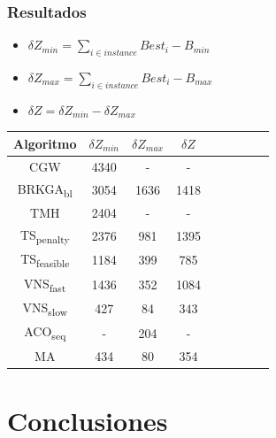 \documentclass{beamer}
\begin{document}

\begin{frame}
\frametitle{Resultados}

\begin{itemize}
    \item $\delta Z_{min} = \sum_{i \in instance} Best_i - B_{min}$
    \pause
    \item $\delta Z_{max} = \sum_{i \in instance} Best_i - B_{max}$
    \pause
    \item $\delta Z = \delta Z_{min} - \delta Z_{max}$
    \pause
\end{itemize}

\begin{table}
\begin{center}
\begin{tabular}{ |c|c|c|c|c|c|c|c|c| } 
\hline
Algoritmo & $\delta Z_{min}$ & $\delta Z_{max}$ & $\delta Z$  \\
\hline
CGW & 4340 & - & -  \\
BRKGA\textsubscript{bl} & 3054 & 1636 & 1418  \\
TMH & 2404 & - & -  \\
TS\textsubscript{penalty} & 2376 & 981 & 1395  \\
TS\textsubscript{feasible} & 1184 & 399 & 785  \\
VNS\textsubscript{fast} & 1436 & 352 & 1084  \\
VNS\textsubscript{slow} & 427 & 84 & 343  \\
ACO\textsubscript{seq} & - & 204 & -  \\
MA & 434 & 80 & 354  \\
\hline
\end{tabular}
\end{center}
\label{tab:resultadosSintesis}
\end{table}

\end{frame}


\section{Conclusiones}
\end{document}
